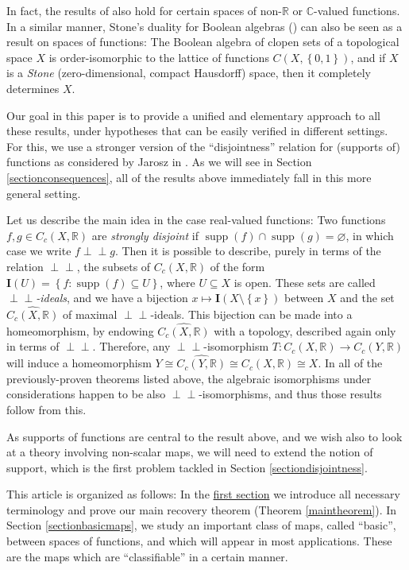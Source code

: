 \documentclass[letter,11pt]{amsart}
\theoremstyle{plain}		\newtheorem{theorem}[generalnumbering]{Theorem}
\theoremstyle{plain}		\newtheorem{corollary}[generalnumbering]{Corollary}
\theoremstyle{definition}		\newtheorem{definition}[generalnumbering]{Definition}
\theoremstyle{definition}		\newtheorem{example}[generalnumbering]{Example}
\theoremstyle{plain}		\newtheorem{proposition}[generalnumbering]{Proposition}
\theoremstyle{plain}		\newtheorem{lemma}[generalnumbering]{Lemma}
\theoremstyle{definition}
\newcommand{\perpp}{\perp\!\!\!\perp}
\DeclareMathOperator{\supp}{supp}
\begin{document}
In fact, the results of \cite{MR0020715,MR2324919} also hold for certain spaces of non-$\mathbb{R}$ or $\mathbb{C}$-valued functions. In a similar manner, Stone's duality for Boolean algebras (\cite{MR1501865}) can also be seen as a result on spaces of functions: The Boolean algebra of clopen sets of a topological space $X$ is order-isomorphic to the lattice of functions $C(X,\left\{0,1\right\})$, and if $X$ is a \emph{Stone} (zero-dimensional, compact Hausdorff) space, then it completely determines $X$.

Our goal in this paper is to provide a unified and elementary approach to all these results, under hypotheses that can be easily verified in different settings. For this, we use a stronger version of the ``disjointness'' relation for (supports of) functions as considered by Jarosz in \cite{MR1060366}. As we will see in Section \ref{sectionconsequences}, all of the results above immediately fall in this more general setting.

Let us describe the main idea in the case real-valued functions: Two functions $f,g\in C_c(X,\mathbb{R})$ are \emph{strongly disjoint} if $\supp(f)\cap\supp(g)=\varnothing$, in which case we write $f\perpp g$. Then it is possible to describe, purely in terms of the relation $\perpp$, the subsets of  $C_c(X,\mathbb{R})$ of the form $\mathbf{I}(U)=\left\{f:\supp(f)\subseteq U\right\}$, where $U\subseteq X$ is open. These sets are called \emph{$\perpp$-ideals}, and we have a bijection $x\mapsto \mathbf{I}(X\setminus\left\{x\right\})$ between $X$ and the set $\widehat{C_c(X,\mathbb{R})}$ of maximal $\perpp$-ideals. This bijection can be made into a homeomorphism, by endowing $\widehat{C_c(X,\mathbb{R})}$ with a topology, described again only in terms of $\perpp$. Therefore, any $\perpp$-isomorphism $T\colon C_c(X,\mathbb{R})\to C_c(Y,\mathbb{R})$ will induce a homeomorphism $Y\cong\widehat{C_c(Y,\mathbb{R})}\cong \widehat{C_c(X,\mathbb{R})}\cong X$. In all of the previously-proven theorems listed above, the algebraic isomorphisms under considerations happen to be also $\perpp$-isomorphisms, and thus those results follow from this.

As supports of functions are central to the result above, and we wish also to look at a theory involving non-scalar maps, we will need to extend the notion of support, which is the first problem tackled in Section \ref{sectiondisjointness}.

This article is organized as follows: In the \hyperref[sectiondisjointness]{first section} we introduce all necessary terminology and prove our main recovery theorem (Theorem \ref{maintheorem}). In Section \ref{sectionbasicmaps}, we study an important class of maps, called ``basic'', between spaces of functions, and which will appear in most applications. These are the maps which are ``classifiable'' in a certain manner.
\end{document}
